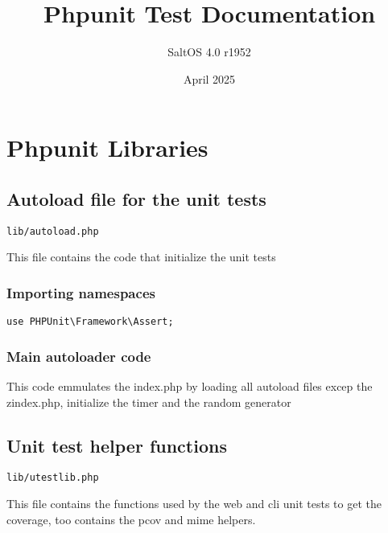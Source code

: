 \documentclass[a4paper]{article}
\title{Phpunit Test Documentation}
\author{SaltOS 4.0 r1952}
\begin{document}
\date{April 2025}
\maketitle
\clearpage

\tableofcontents
\clearpage


\hypertarget{toc1}{}
\section{Phpunit Libraries}

\hypertarget{toc2}{}
\subsection{Autoload file for the unit tests}

\begin{lstlisting}
lib/autoload.php
\end{lstlisting}

This file contains the code that initialize the unit tests

\hypertarget{toc3}{}
\subsubsection{Importing namespaces}

\begin{lstlisting}
use PHPUnit\Framework\Assert;
\end{lstlisting}

\hypertarget{toc4}{}
\subsubsection{Main autoloader code}

This code emmulates the index.php by loading all autoload files excep
the zindex.php, initialize the timer and the random generator

\hypertarget{toc5}{}
\subsection{Unit test helper functions}

\begin{lstlisting}
lib/utestlib.php
\end{lstlisting}

This file contains the functions used by the web and cli unit tests
to get the coverage, too contains the pcov and mime helpers.

\hypertarget{toc6}{}
\end{document}
